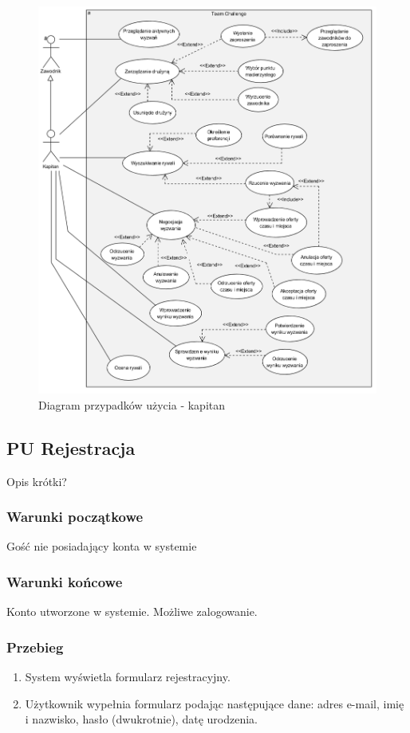 \begin{figure}[H]
\centering
\includegraphics[width=\linewidth]{04-projekt/rys/usecase3.PNG}
\caption{Diagram przypadków użycia - kapitan}
\label{fig:diagram-trad-alg-opt}
\end{figure}


\subsection{PU Rejestracja}

Opis krótki?

\subsubsection{Warunki początkowe}
Gość nie posiadający konta w systemie
\subsubsection{Warunki końcowe}
Konto utworzone w systemie. Możliwe zalogowanie.
\subsubsection{Przebieg}
\begin{enumerate}
  \item System wyświetla formularz rejestracyjny.
  \item Użytkownik wypełnia formularz podając następujące dane: adres e-mail, imię i nazwisko, hasło (dwukrotnie), datę urodzenia.

\end{enumerate}


